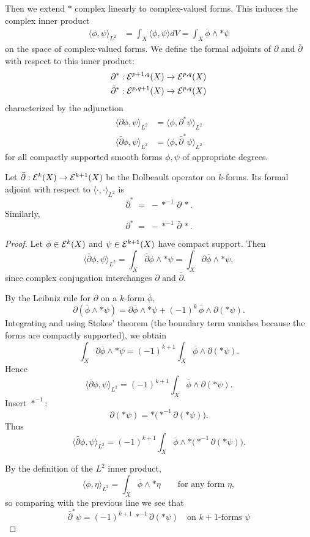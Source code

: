 \documentclass[12pt]{article}
\begin{document}
Then we extend $*$ complex linearly to complex-valued forms. This induces the complex inner product \begin{align*}
    \langle \phi, \psi \rangle_{L^2} &= \int_X \langle  \phi, \psi \rangle dV = \int_X \overline{\phi} \wedge * \psi
\end{align*} on the space of complex-valued forms. We define the formal adjoints of $\partial$ and $\bar{\partial}$ with respect to this inner product: \begin{align*}
    \partial^* & : {\mathcal{E}}^{p+1,q}(X) \to {\mathcal{E}}^{p,q}(X) \\
    \bar{\partial}^* & : {\mathcal{E}}^{p,q+1}(X) \to {\mathcal{E}}^{p,q}(X)
\end{align*} characterized by the adjunction 
\begin{align*}
    \langle \partial \phi, \psi \rangle_{L^2} & = \langle \phi, \partial^* \psi \rangle_{L^2} \\
    \langle \bar{\partial} \phi, \psi \rangle_{L^2} & = \langle \phi, \bar{\partial}^* \psi \rangle_{L^2}
\end{align*} for all compactly supported smooth forms $\phi, \psi$ of appropriate degrees. 

\begin{proposition}
Let $\bar\partial:{\mathcal{E}}^{k}(X)\to{\mathcal{E}}^{k+1}(X)$ be the Dolbeault operator on
$k$-forms.  Its formal adjoint with respect to $\langle\cdot,\cdot\rangle_{L^2}$
is
\[
\bar\partial^* \;=\; - *^{-1}\,\partial\,*.
\]
Similarly,
\[
\partial^* \;=\; - *^{-1}\,\bar\partial\,*.
\]
\end{proposition}

\begin{proof}
Let $\phi\in{\mathcal{E}}^{k}(X)$ and $\psi\in{\mathcal{E}}^{k+1}(X)$ have compact support.
Then
\[
\langle\bar\partial\phi,\psi\rangle_{L^2}
 = \int_X \overline{\bar\partial\phi}\wedge *\psi
 = \int_X \partial\overline{\phi}\wedge *\psi,
\]
since complex conjugation interchanges $\partial$ and $\bar\partial$.

By the Leibniz rule for $\partial$ on a $k$-form $\overline{\phi}$,
\[
\partial(\overline{\phi}\wedge *\psi)
 = \partial\overline{\phi}\wedge *\psi
   + (-1)^k\,\overline{\phi}\wedge\partial(*\psi).
\]
Integrating and using Stokes' theorem (the boundary term vanishes because
the forms are compactly supported), we obtain
\[
\int_X \partial\overline{\phi}\wedge *\psi
 = (-1)^{k+1}\int_X \overline{\phi}\wedge\partial(*\psi).
\]
Hence
\[
\langle\bar\partial\phi,\psi\rangle_{L^2}
 = (-1)^{k+1}\int_X \overline{\phi}\wedge\partial(*\psi).
\]
Insert $*^{-1}$:
\[
\partial(*\psi)
 = *\bigl(*^{-1}\partial(*\psi)\bigr).
\]
Thus
\[
\langle\bar\partial\phi,\psi\rangle_{L^2}
 = (-1)^{k+1}\int_X
    \overline{\phi}\wedge *\bigl(*^{-1}\partial(*\psi)\bigr).
\]

By the definition of the $L^2$ inner product,
\[
\langle\phi,\eta\rangle_{L^2}
 = \int_X \overline{\phi}\wedge *\eta
\qquad\text{for any form }\eta,
\]
so comparing with the previous line we see that
\[
\bar\partial^*\psi
 = (-1)^{k+1}\,*^{-1}\partial(*\psi)
\quad\text{on $k+1$-forms }\psi 
\]  
\end{proof}
\end{document}
